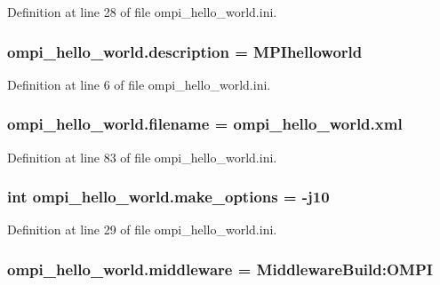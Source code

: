 Definition at line 28 of file ompi\-\_\-hello\-\_\-world.\-ini.

\hypertarget{namespaceompi__hello__world_a52b9c10821e333fe5c7413d414abeb1b}{
\subsubsection[{description}]{\setlength{\rightskip}{0pt plus 5cm}ompi\-\_\-hello\-\_\-world.\-description = M\-P\-Ihelloworld}}\label{namespaceompi__hello__world_a52b9c10821e333fe5c7413d414abeb1b}


Definition at line 6 of file ompi\-\_\-hello\-\_\-world.\-ini.

\hypertarget{namespaceompi__hello__world_ae42ce8011012447dba87c7337e9ddab8}{
\subsubsection[{filename}]{\setlength{\rightskip}{0pt plus 5cm}ompi\-\_\-hello\-\_\-world.\-filename = ompi\-\_\-hello\-\_\-world.\-xml}}\label{namespaceompi__hello__world_ae42ce8011012447dba87c7337e9ddab8}


Definition at line 83 of file ompi\-\_\-hello\-\_\-world.\-ini.

\hypertarget{namespaceompi__hello__world_a3b1603e3acde68a17311cb93a6a5ef12}{
\subsubsection[{make\-\_\-options}]{\setlength{\rightskip}{0pt plus 5cm}int ompi\-\_\-hello\-\_\-world.\-make\-\_\-options = -\/j10}}\label{namespaceompi__hello__world_a3b1603e3acde68a17311cb93a6a5ef12}


Definition at line 29 of file ompi\-\_\-hello\-\_\-world.\-ini.

\hypertarget{namespaceompi__hello__world_a64807561a94c3ff5b1c9a945e580f643}{
\subsubsection[{middleware}]{\setlength{\rightskip}{0pt plus 5cm}ompi\-\_\-hello\-\_\-world.\-middleware = Middleware\-Build\-:\-O\-M\-P\-I}}\label{namespaceompi__hello__world_a64807561a94c3ff5b1c9a945e580f643}


